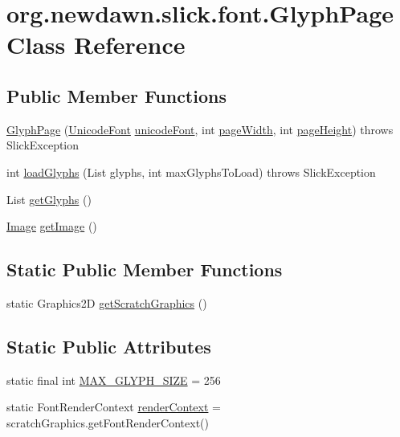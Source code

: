 \hypertarget{classorg_1_1newdawn_1_1slick_1_1font_1_1_glyph_page}{}\section{org.\+newdawn.\+slick.\+font.\+Glyph\+Page Class Reference}
\label{classorg_1_1newdawn_1_1slick_1_1font_1_1_glyph_page}
\subsection*{Public Member Functions}
\begin{DoxyCompactItemize}
\item 
\mbox{\hyperlink{classorg_1_1newdawn_1_1slick_1_1font_1_1_glyph_page_a69fca021e03c5cb4b44c24d36251bc1b}{Glyph\+Page}} (\mbox{\hyperlink{classorg_1_1newdawn_1_1slick_1_1_unicode_font}{Unicode\+Font}} \mbox{\hyperlink{classorg_1_1newdawn_1_1slick_1_1font_1_1_glyph_page_a24df618c9e902dd841e708d572559641}{unicode\+Font}}, int \mbox{\hyperlink{classorg_1_1newdawn_1_1slick_1_1font_1_1_glyph_page_a92a417a19c115ae906499f7d8c026130}{page\+Width}}, int \mbox{\hyperlink{classorg_1_1newdawn_1_1slick_1_1font_1_1_glyph_page_a87d58eab40df58d9ad0d1cd5f2d0db3b}{page\+Height}})  throws Slick\+Exception 
\item 
int \mbox{\hyperlink{classorg_1_1newdawn_1_1slick_1_1font_1_1_glyph_page_a2123a4715446781b1baae6f8a4c7d811}{load\+Glyphs}} (List glyphs, int max\+Glyphs\+To\+Load)  throws Slick\+Exception 
\item 
List \mbox{\hyperlink{classorg_1_1newdawn_1_1slick_1_1font_1_1_glyph_page_a1255caa181a9f4d6fa6442a8ddc17546}{get\+Glyphs}} ()
\item 
\mbox{\hyperlink{classorg_1_1newdawn_1_1slick_1_1_image}{Image}} \mbox{\hyperlink{classorg_1_1newdawn_1_1slick_1_1font_1_1_glyph_page_ae2b1131c437b43c1c3e6d774d09f9ee7}{get\+Image}} ()
\end{DoxyCompactItemize}
\subsection*{Static Public Member Functions}
\begin{DoxyCompactItemize}
\item 
static Graphics2D \mbox{\hyperlink{classorg_1_1newdawn_1_1slick_1_1font_1_1_glyph_page_a0c33343f5d5b8c363cace62804c1d443}{get\+Scratch\+Graphics}} ()
\end{DoxyCompactItemize}
\subsection*{Static Public Attributes}
\begin{DoxyCompactItemize}
\item 
static final int \mbox{\hyperlink{classorg_1_1newdawn_1_1slick_1_1font_1_1_glyph_page_ac45492a4d734e35753d7fa4f7730e5c1}{M\+A\+X\+\_\+\+G\+L\+Y\+P\+H\+\_\+\+S\+I\+ZE}} = 256
\item 
static Font\+Render\+Context \mbox{\hyperlink{classorg_1_1newdawn_1_1slick_1_1font_1_1_glyph_page_ad822e77c036e6182652982a3def3de64}{render\+Context}} = scratch\+Graphics.\+get\+Font\+Render\+Context()
\end{DoxyCompactItemize}
